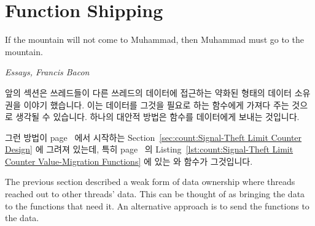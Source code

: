 \iffalse

Partial data ownership is also common within the Linux kernel.
For example, a given CPU might be permitted to read a given set of its
own per-CPU variables only with interrupts disabled, another CPU might
be permitted to read that same set of the first CPU's per-CPU variables
only when holding the corresponding per-CPU lock.
Then that given CPU would be permitted to update this set of its own
per-CPU variables if it both has interrupts disabled and holds its
per-CPU lock.
This arrangement can be thought of as a reader-writer lock that allows
each CPU very low-overhead access to its own set of per-CPU variables.
There are a great many variations on this theme.

For its own part, pure data ownership is also both common and useful,
for example, the per-thread memory-allocator caches discussed in
Section~\ref{sec:SMPdesign:Resource Allocator Caches}
starting on
page~\pageref{sec:SMPdesign:Resource Allocator Caches}.
In this algorithm, each thread's cache is completely private to that
thread.

\fi

\section{Function Shipping}
\label{sec:owned:Function Shipping}
%
\epigraph{If the mountain will not come to Muhammad, then Muhammad must
	  go to the mountain.}
	 {\emph{Essays, Francis Bacon}}

앞의 섹션은 쓰레드들이 다른 쓰레드의 데이터에 접근하는 약화된 형태의 데이터
소유권을 이야기 했습니다.
이는 데이터를 그것을 필요로 하는 함수에게 가져다 주는 것으로 생각될 수
있습니다.
하나의 대안적 방법은 함수를 데이터에게 보내는 것입니다.

그런 방법이
page~\pageref{sec:count:Signal-Theft Limit Counter Design}
에서 시작하는
Section~\ref{sec:count:Signal-Theft Limit Counter Design}
에 그려져 있는데, 특히
page~\pageref{lst:count:Signal-Theft Limit Counter Value-Migration Functions}
의
Listing~\ref{lst:count:Signal-Theft Limit Counter Value-Migration Functions}
에 있는  와  함수가
그것입니다.

\iffalse

The previous section described a weak form of data ownership where
threads reached out to other threads' data.
This can be thought of as bringing the data to the functions that
need it.
An alternative approach is to send the functions to the data.

